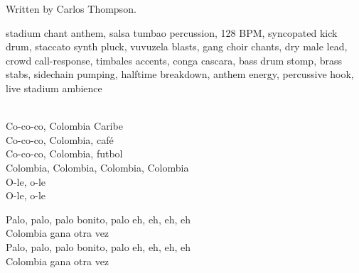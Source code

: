 
\begin{notes}
Written by Carlos Thompson.
\end{notes}
\begin{style}
stadium chant anthem, salsa tumbao percussion, 128 BPM, syncopated kick drum, staccato synth pluck, vuvuzela blasts, gang choir chants, dry male lead, crowd call-response, timbales accents, conga cascara, bass drum stomp, brass stabs, sidechain pumping, halftime breakdown, anthem energy, percussive hook, live stadium ambience
\end{style}
\begin{lyrics}

\\
Co-co-co, Colombia Caribe\\
Co-co-co, Colombia, café\\
Co-co-co, Colombia, futbol\\
Colombia, Colombia, Colombia, Colombia\\
O-le, o-le \\
O-le, o-le 

Palo, palo, palo bonito, palo eh, eh, eh, eh\\
Colombia gana otra vez\\
Palo, palo, palo bonito, palo eh, eh, eh, eh\\
Colombia gana otra vez
\end{lyrics}

